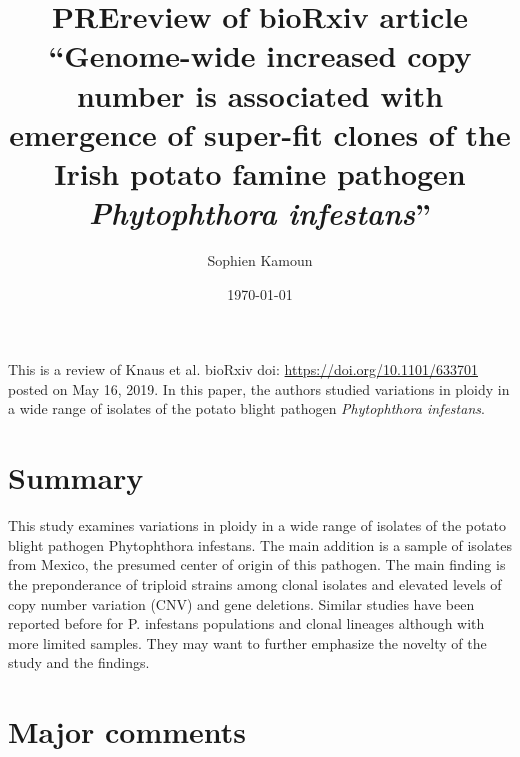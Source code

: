 \documentclass[10pt]{article}
\renewenvironment{abstract}
  {{\bfseries\noindent{\abstractname}\par\nobreak}\footnotesize}
  {\bigskip}
\begin{document}
\title{PREreview of bioRxiv article ``Genome-wide increased copy number is
associated with emergence of super-fit clones of the Irish potato famine
pathogen \emph{Phytophthora infestans}''}



\author[1]{Sophien Kamoun}%
%


\vspace{-1em}



  \date{\today}


\begingroup
\let\center\flushleft
\let\endcenter\endflushleft
\maketitle
\endgroup





\begin{abstract}
This is a review of Knaus et al. bioRxiv doi:
\url{https://doi.org/10.1101/633701} posted on May 16, 2019. In this
paper, the authors studied variations in ploidy in a wide range of
isolates of the potato blight pathogen \emph{Phytophthora infestans}.%
\end{abstract}%




\section*{Summary}

{\label{937022}}

This study examines variations in ploidy in a wide range of isolates of
the potato blight pathogen Phytophthora infestans. The main addition is
a sample of isolates from Mexico, the presumed center of origin of this
pathogen. The main finding is the preponderance of triploid strains
among clonal isolates and elevated levels of copy number variation (CNV)
and gene deletions. Similar studies have been reported before for P.
infestans populations and clonal lineages although with more limited
samples. They may want to further emphasize the novelty of the study and
the findings.

\par\null

\section*{Major comments}
\end{document}
